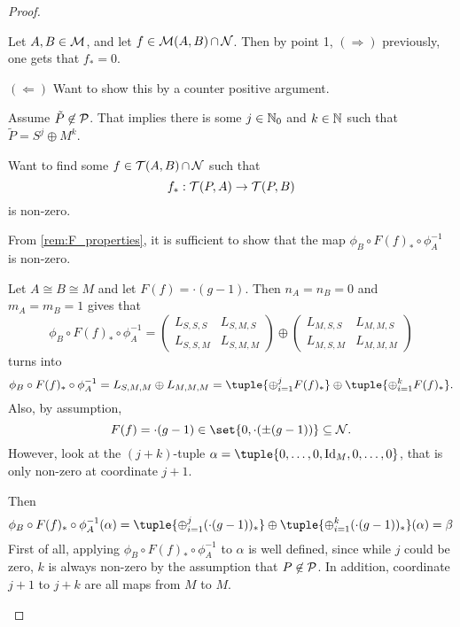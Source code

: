 \begin{proof}
\begin{enumerate}
{            Let \( A, B \in {\mathcal{M}} \), and let \( f \in {\mathcal{M}}(A, B) \mathop{\cap}\limits {\mathcal{N}} \). Then by point 1, \( (\Rightarrow) \) previously, one gets that \( f_* = 0 \).
            
            \( (\Leftarrow) \) Want to show this by a counter positive argument.

            Assume \( \tilde{P} \not\in {\mathcal{P}} \). That implies there is some \( j \in {\mathbb{N}}_0 \) and \( k \in {\mathbb{N}} \) such that \( \tilde{P} = S^j \oplus M^k \).

            Want to find some \( f \in {\mathcal{T}}(A, B) \mathop{\cap}\limits {\mathcal{N}} \) such that
            \[
                f_*: {\mathcal{T}}(P, A) \to {\mathcal{T}}(P, B)
            \]
            is non-zero.

            From \autoref{rem:F_properties}, it is sufficient to show that the map \( \phi_B \circ F(f)_* \circ \phi_A^{-1} \) is non-zero.

            Let \( A \cong B \cong M \) and let \( F(f) = \cdot(g - 1) \). Then \( n_A = n_B = 0 \) and \( m_A = m_B = 1 \) gives that
            \[
                \phi_B \circ F(f)_* \circ \phi_A^{-1} =
                \begin{pmatrix}
                    L_{S, S, S} & L_{S, M, S} \\
                    L_{S, S, M } & L_{S, M, M}
                \end{pmatrix}
                \oplus
                \begin{pmatrix}
                    L_{M, S, S} & L_{M, M, S} \\
                    L_{M, S, M} & L_{M, M, M}
                \end{pmatrix}
            \]
            turns into
            \[
                \phi_B \circ F(f)_* \circ \phi_A^{-1}
                = L_{S, M, M} \oplus L_{M, M, M}
                = \tuple{ \oplus_{i=1}^j F(f)_* }
                \oplus
                \tuple{ \oplus_{i=1}^k F(f)_* }.
            \]
            Also, by assumption,
            \[
                F(f) = \cdot(g-1) \in \set{0, \cdot( \pm(g - 1) )} \subseteq \Nc.
            \]
            However, look at the \( (j + k) \)-tuple \( \alpha = \tuple{ 0, \dots, 0, \Id_M, 0, \dots, 0 } \), that is only non-zero at coordinate \( j + 1 \).
            
            Then
            \[
                \phi_B \circ F(f)_* \circ \phi_A^{-1} (\alpha)
                =
                \tuple{ \oplus_{i=1}^j (\cdot(g-1))_* }
                \oplus
                \tuple{ \oplus_{i=1}^k (\cdot(g-1))_* }
                (\alpha)
                = \beta
            \]
            First of all, applying \( \phi_B \circ F(f)_* \circ \phi_A^{-1} \) to \( \alpha \) is well defined, since while \( j \) could be zero, \( k \) is always non-zero by the assumption that \( P \not\in {\mathcal{P}} \). In addition, coordinate \( j + 1 \) to \( j + k \) are all maps from \( M \) to \( M \).

}
\end{enumerate}
\end{proof}
